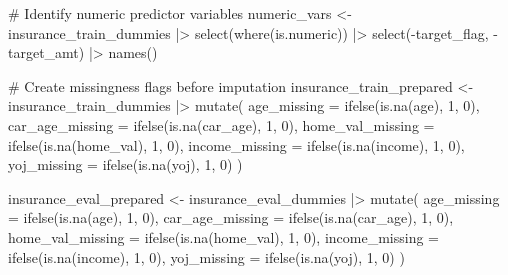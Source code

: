 \documentclass[
  11pt]{article}
\newenvironment{Shaded}{\begin{snugshade}}{\end{snugshade}}
\newcommand{\AttributeTok}[1]{\textcolor[rgb]{0.40,0.45,0.13}{#1}}
\newcommand{\CommentTok}[1]{\textcolor[rgb]{0.37,0.37,0.37}{#1}}
\newcommand{\DecValTok}[1]{\textcolor[rgb]{0.68,0.00,0.00}{#1}}
\newcommand{\FunctionTok}[1]{\textcolor[rgb]{0.28,0.35,0.67}{#1}}
\newcommand{\NormalTok}[1]{\textcolor[rgb]{0.00,0.23,0.31}{#1}}
\newcommand{\OtherTok}[1]{\textcolor[rgb]{0.00,0.23,0.31}{#1}}
\newcommand{\SpecialCharTok}[1]{\textcolor[rgb]{0.37,0.37,0.37}{#1}}
\begin{document}
\begin{Shaded}
\begin{Highlighting}[]
\CommentTok{\# Identify numeric predictor variables}
\NormalTok{numeric\_vars }\OtherTok{\textless{}{-}}\NormalTok{ insurance\_train\_dummies }\SpecialCharTok{|\textgreater{}}
  \FunctionTok{select}\NormalTok{(}\FunctionTok{where}\NormalTok{(is.numeric)) }\SpecialCharTok{|\textgreater{}}
  \FunctionTok{select}\NormalTok{(}\SpecialCharTok{{-}}\NormalTok{target\_flag, }\SpecialCharTok{{-}}\NormalTok{target\_amt) }\SpecialCharTok{|\textgreater{}}
  \FunctionTok{names}\NormalTok{()}

\CommentTok{\# Create missingness flags before imputation}
\NormalTok{insurance\_train\_prepared }\OtherTok{\textless{}{-}}\NormalTok{ insurance\_train\_dummies }\SpecialCharTok{|\textgreater{}}
  \FunctionTok{mutate}\NormalTok{(}
    \AttributeTok{age\_missing =} \FunctionTok{ifelse}\NormalTok{(}\FunctionTok{is.na}\NormalTok{(age), }\DecValTok{1}\NormalTok{, }\DecValTok{0}\NormalTok{),}
    \AttributeTok{car\_age\_missing =} \FunctionTok{ifelse}\NormalTok{(}\FunctionTok{is.na}\NormalTok{(car\_age), }\DecValTok{1}\NormalTok{, }\DecValTok{0}\NormalTok{),}
    \AttributeTok{home\_val\_missing =} \FunctionTok{ifelse}\NormalTok{(}\FunctionTok{is.na}\NormalTok{(home\_val), }\DecValTok{1}\NormalTok{, }\DecValTok{0}\NormalTok{),}
    \AttributeTok{income\_missing =} \FunctionTok{ifelse}\NormalTok{(}\FunctionTok{is.na}\NormalTok{(income), }\DecValTok{1}\NormalTok{, }\DecValTok{0}\NormalTok{),}
    \AttributeTok{yoj\_missing =} \FunctionTok{ifelse}\NormalTok{(}\FunctionTok{is.na}\NormalTok{(yoj), }\DecValTok{1}\NormalTok{, }\DecValTok{0}\NormalTok{)}
\NormalTok{  )}

\NormalTok{insurance\_eval\_prepared }\OtherTok{\textless{}{-}}\NormalTok{ insurance\_eval\_dummies }\SpecialCharTok{|\textgreater{}}
  \FunctionTok{mutate}\NormalTok{(}
    \AttributeTok{age\_missing =} \FunctionTok{ifelse}\NormalTok{(}\FunctionTok{is.na}\NormalTok{(age), }\DecValTok{1}\NormalTok{, }\DecValTok{0}\NormalTok{),}
    \AttributeTok{car\_age\_missing =} \FunctionTok{ifelse}\NormalTok{(}\FunctionTok{is.na}\NormalTok{(car\_age), }\DecValTok{1}\NormalTok{, }\DecValTok{0}\NormalTok{),}
    \AttributeTok{home\_val\_missing =} \FunctionTok{ifelse}\NormalTok{(}\FunctionTok{is.na}\NormalTok{(home\_val), }\DecValTok{1}\NormalTok{, }\DecValTok{0}\NormalTok{),}
    \AttributeTok{income\_missing =} \FunctionTok{ifelse}\NormalTok{(}\FunctionTok{is.na}\NormalTok{(income), }\DecValTok{1}\NormalTok{, }\DecValTok{0}\NormalTok{),}
    \AttributeTok{yoj\_missing =} \FunctionTok{ifelse}\NormalTok{(}\FunctionTok{is.na}\NormalTok{(yoj), }\DecValTok{1}\NormalTok{, }\DecValTok{0}\NormalTok{)}
\NormalTok{  )}


\end{Highlighting}
\end{Shaded}
\end{document}

